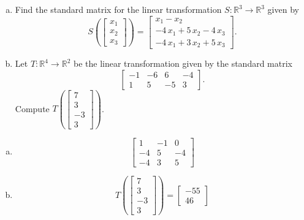 
\begin{exerciseStatement}

\begin{enumerate}[(a)]
\item Find the standard matrix for the linear transformation \(S:\mathbb{R}^ 3  \to \mathbb{R}^ 3 \) given by \[S\left(  \left[\begin{array}{c}
x_{1} \\
x_{2} \\
x_{3}
\end{array}\right]  \right) =  \left[\begin{array}{c}
x_{1} - x_{2} \\
-4 \, x_{1} + 5 \, x_{2} - 4 \, x_{3} \\
-4 \, x_{1} + 3 \, x_{2} + 5 \, x_{3}
\end{array}\right] .\]
\item Let \(T:\mathbb{R}^ 4  \to \mathbb{R}^ 2 \) be the linear transformation given by the standard matrix \[ \left[\begin{array}{cccc}
-1 & -6 & 6 & -4 \\
1 & 5 & -5 & 3
\end{array}\right] .\] Compute \(T\left( \left[\begin{array}{c}
7 \\
3 \\
-3 \\
3
\end{array}\right]  \right)\). 
\end{enumerate}
    
\end{exerciseStatement}
    
\begin{exerciseAnswer} 

\begin{enumerate}[(a)]
\item \[ \left[\begin{array}{ccc}
1 & -1 & 0 \\
-4 & 5 & -4 \\
-4 & 3 & 5
\end{array}\right] \]
\item \[T\left( \left[\begin{array}{c}
7 \\
3 \\
-3 \\
3
\end{array}\right]  \right)= \left[\begin{array}{c}
-55 \\
46
\end{array}\right] \]
\end{enumerate}
    
\end{exerciseAnswer}
    
